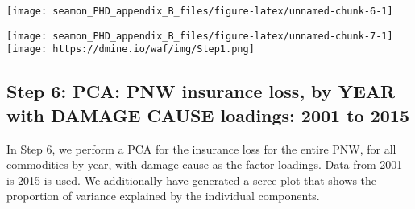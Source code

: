\documentclass[]{article}
\newenvironment{Shaded}{\begin{snugshade}}{\end{snugshade}}
\newcommand{\CommentTok}[1]{\textcolor[rgb]{0.56,0.35,0.01}{\textit{#1}}}
\newcommand{\DataTypeTok}[1]{\textcolor[rgb]{0.13,0.29,0.53}{#1}}
\newcommand{\DecValTok}[1]{\textcolor[rgb]{0.00,0.00,0.81}{#1}}
\newcommand{\KeywordTok}[1]{\textcolor[rgb]{0.13,0.29,0.53}{\textbf{#1}}}
\newcommand{\NormalTok}[1]{#1}
\newcommand{\OperatorTok}[1]{\textcolor[rgb]{0.81,0.36,0.00}{\textbf{#1}}}
\newcommand{\StringTok}[1]{\textcolor[rgb]{0.31,0.60,0.02}{#1}}
\begin{document}
\texttt{[image: seamon\_PHD\_appendix\_B\_files/figure-latex/unnamed-chunk-6-1]}

\begin{Shaded}
\end{Shaded}

\texttt{[image: seamon\_PHD\_appendix\_B\_files/figure-latex/unnamed-chunk-7-1]}
\texttt{[image: https://dmine.io/waf/img/Step1.png]}

\hypertarget{step-6-pca-pnw-insurance-loss-by-year-with-damage-cause-loadings-2001-to-2015}{%
\subsection{Step 6: PCA: PNW insurance loss, by YEAR with DAMAGE CAUSE
loadings: 2001 to
2015}\label{step-6-pca-pnw-insurance-loss-by-year-with-damage-cause-loadings-2001-to-2015}}

In Step 6, we perform a PCA for the insurance loss for the entire PNW,
for all commodities by year, with damage cause as the factor loadings.
Data from 2001 is 2015 is used. We additionally have generated a scree
plot that shows the proportion of variance explained by the individual
components.
\end{document}
